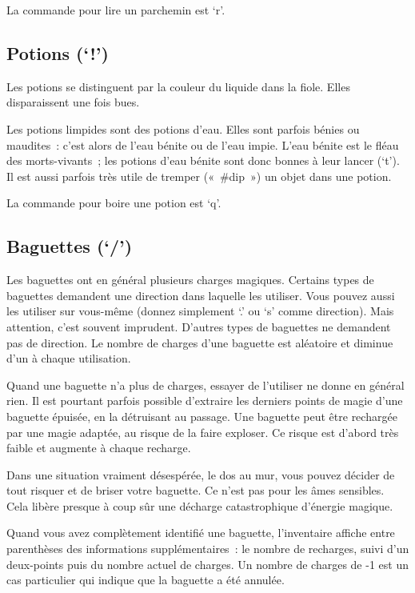\documentclass[titlepage]{article}
\begin{document}
La commande pour lire un parchemin est `r'.

\subsection{Potions (`!')}



Les potions se distinguent par la couleur du liquide dans la fiole.
Elles disparaissent une fois bues.


Les potions limpides sont des potions d'eau.
Elles sont parfois bénies ou maudites~: c'est alors de l'eau bénite ou de
l'eau impie.
L'eau bénite est le fléau des morts-vivants~; les potions d'eau bénite
sont donc bonnes à leur lancer (`t').
Il est aussi parfois très utile de tremper («~\#dip~») un objet dans
une potion.


La commande pour boire une potion est `q'.

\subsection{Baguettes (`/')}



Les baguettes ont en général plusieurs charges magiques.
Certains types de baguettes demandent une direction dans laquelle les
utiliser.
Vous pouvez aussi les utiliser sur vous-même (donnez simplement `.' ou
`s' comme direction).
Mais attention, c'est souvent imprudent.
D'autres types de baguettes ne demandent pas de direction.
Le nombre de charges d'une baguette est aléatoire et diminue d'un à chaque
utilisation.


Quand une baguette n'a plus de charges, essayer de l'utiliser ne donne en
général rien.
Il est pourtant parfois possible d'extraire les derniers points de magie
d'une baguette épuisée, en la détruisant au passage.
Une baguette peut être rechargée par une magie adaptée, au risque de la
faire exploser.
Ce risque est d'abord très faible et augmente à chaque recharge.


Dans une situation vraiment désespérée, le dos au mur, vous pouvez décider
de tout risquer et de briser votre baguette.
Ce n'est pas pour les âmes sensibles.
Cela libère presque à coup sûr une décharge catastrophique d'énergie
magique.


Quand vous avez complètement identifié une baguette, l'inventaire affiche
entre parenthèses des informations supplémentaires~: le nombre de
recharges, suivi d'un deux-points puis du nombre actuel de charges.
Un nombre de charges de -1 est un cas particulier qui indique que la
baguette a été annulée.
\end{document}
